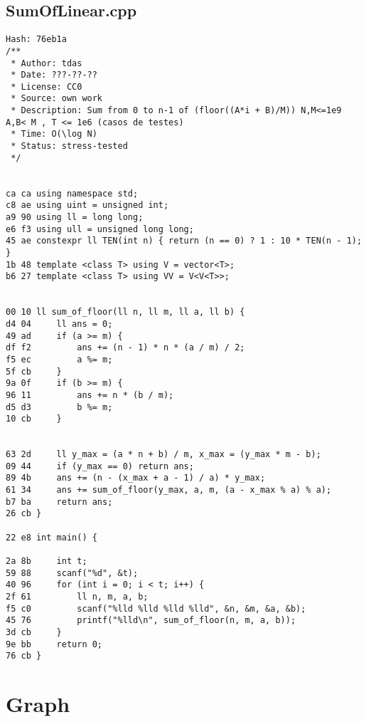 \documentclass[11pt, a4paper, twoside]{article}
\begin{document}
\subsection{SumOfLinear.cpp}
\begin{lstlisting}
Hash: 76eb1a
/**
 * Author: tdas
 * Date: ???-??-??
 * License: CC0
 * Source: own work
 * Description: Sum from 0 to n-1 of (floor((A*i + B)/M)) N,M<=1e9 A,B< M , T <= 1e6 (casos de testes)
 * Time: O(\log N)
 * Status: stress-tested
 */


ca ca using namespace std;
c8 ae using uint = unsigned int;
a9 90 using ll = long long;
e6 f3 using ull = unsigned long long;
45 ae constexpr ll TEN(int n) { return (n == 0) ? 1 : 10 * TEN(n - 1); }
1b 48 template <class T> using V = vector<T>;
b6 27 template <class T> using VV = V<V<T>>;


00 10 ll sum_of_floor(ll n, ll m, ll a, ll b) {
d4 04     ll ans = 0;
49 ad     if (a >= m) {
df f2         ans += (n - 1) * n * (a / m) / 2;
f5 ec         a %= m;
5f cb     }
9a 0f     if (b >= m) {
96 11         ans += n * (b / m);
d5 d3         b %= m;
10 cb     }
      
      
63 2d     ll y_max = (a * n + b) / m, x_max = (y_max * m - b);
09 44     if (y_max == 0) return ans;
89 4b     ans += (n - (x_max + a - 1) / a) * y_max;
61 34     ans += sum_of_floor(y_max, a, m, (a - x_max % a) % a);
b7 ba     return ans;
26 cb }

22 e8 int main() {
      
2a 8b     int t;
59 88     scanf("%d", &t);
40 96     for (int i = 0; i < t; i++) {
2f 61         ll n, m, a, b;
f5 c0         scanf("%lld %lld %lld %lld", &n, &m, &a, &b);
45 76         printf("%lld\n", sum_of_floor(n, m, a, b));
3d cb     }
9e bb     return 0;
76 cb }
\end{lstlisting}



%
%

\section{Graph}
\end{document}

